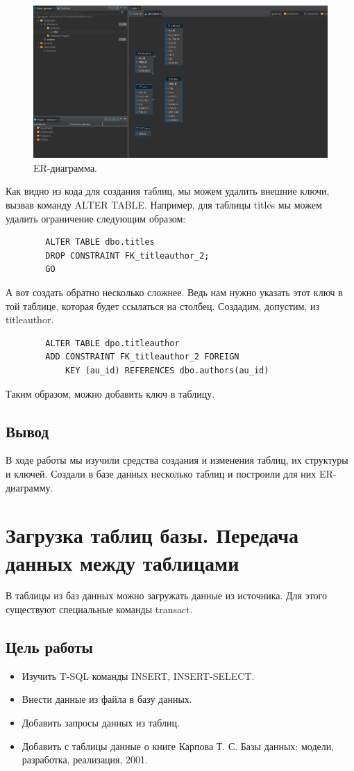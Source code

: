 \begin{figure}
    \centering
    \includegraphics[width=0.8\linewidth]{Pic/lab2/ERP.PNG}
    \caption{ER-диаграмма.}
    \label{fig:ERP}
\end{figure}

Как видно из кода для создания таблиц, мы можем удалить внешние ключи, вызвав команду ALTER TABLE. Например, для таблицы titles мы можем удалить ограничение следующим образом:

\begin{verbatim}
        ALTER TABLE dbo.titles
        DROP CONSTRAINT FK_titleauthor_2;
        GO
\end{verbatim}

А вот создать обратно несколько сложнее. Ведь нам нужно указать этот ключ в той таблице, которая будет ссылаться на столбец. Создадим, допустим, из titleauthor.

\begin{verbatim}
        ALTER TABLE dpo.titleauthor
        ADD CONSTRAINT FK_titleauthor_2 FOREIGN 
            KEY (au_id) REFERENCES dbo.authors(au_id)
\end{verbatim}

Таким образом, можно добавить ключ в таблицу.

\subsection{Вывод}

В ходе работы мы изучили средства создания и изменения таблиц, их структуры и ключей. Создали в базе данных несколько таблиц и построили для них ER-диаграмму.
\newpage
\section{Загрузка таблиц базы. Передача данных между таблицами}
В таблицы из баз данных можно загружать данные из источника. Для этого существуют специальные команды transact.
\label{LAB3}
\subsection{Цель работы}
\begin{itemize}
    \item Изучить T-SQL команды INSERT, INSERT-SELECT.
    \item Внести данные из файла в базу данных.
    \item Добавить запросы данных из таблиц.
    \item Добавить с таблицы данные о книге Карпова Т. С. Базы данных: модели, разработка, реализация, 2001.
\end{itemize}
